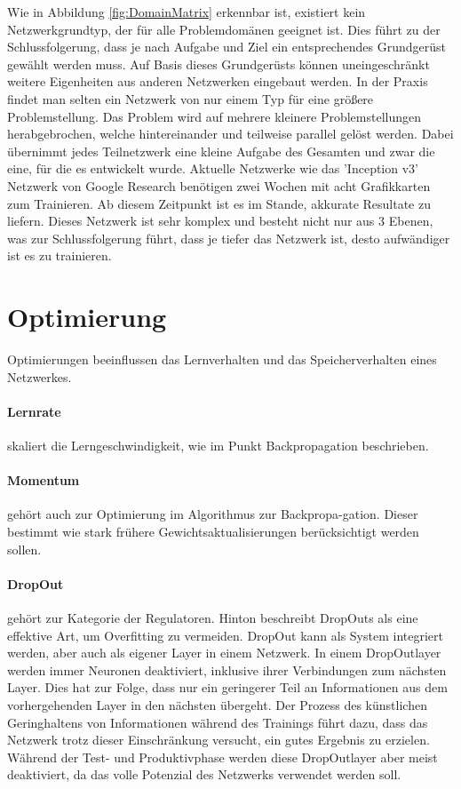Wie in Abbildung \ref{fig:DomainMatrix} erkennbar ist, existiert kein Netzwerkgrundtyp, der für alle Problemdomänen geeignet ist.
Dies führt zu der Schlussfolgerung, dass je nach Aufgabe und Ziel ein entsprechendes Grundgerüst gewählt werden muss. 
Auf Basis dieses Grundgerüsts können uneingeschränkt weitere Eigenheiten aus anderen Netzwerken eingebaut werden.
In der Praxis findet man selten ein Netzwerk von nur einem Typ für eine größere Problemstellung. 
Das Problem wird auf mehrere kleinere Problemstellungen herabgebrochen, welche hintereinander und teilweise parallel gelöst werden.
Dabei übernimmt jedes Teilnetzwerk eine kleine Aufgabe des Gesamten und zwar die eine, für die es entwickelt wurde. 
Aktuelle Netzwerke wie das 'Inception v3' Netzwerk von Google Research benötigen zwei Wochen mit acht Grafikkarten zum Trainieren. 
Ab diesem Zeitpunkt ist es im Stande, akkurate Resultate zu liefern. 
Dieses Netzwerk ist sehr komplex und besteht nicht nur aus 3 Ebenen, was zur Schlussfolgerung führt, dass je tiefer das Netzwerk ist, desto aufwändiger ist es zu trainieren.

\section{Optimierung}

Optimierungen beeinflussen das Lernverhalten und das Speicherverhalten eines Netzwerkes.

\paragraph{Lernrate} skaliert die Lerngeschwindigkeit, wie im Punkt Backpropagation beschrieben.

\paragraph{Momentum} gehört auch zur Optimierung im Algorithmus zur Backpropa-gation.
Dieser bestimmt wie stark frühere Gewichtsaktualisierungen berücksichtigt werden sollen. 

\paragraph{DropOut} gehört zur Kategorie der Regulatoren. 
Hinton \cite{krizhevsky2012imagenet} beschreibt DropOuts als eine effektive Art, um Overfitting zu vermeiden.
DropOut kann als System integriert werden, aber auch als eigener Layer in einem Netzwerk.
In einem DropOutlayer werden immer Neuronen deaktiviert, inklusive ihrer Verbindungen zum nächsten Layer.
Dies hat zur Folge, dass nur ein geringerer Teil an Informationen aus dem vorhergehenden Layer in den nächsten übergeht. 
Der Prozess des künstlichen Geringhaltens von Informationen während des Trainings führt dazu, dass das Netzwerk trotz dieser Einschränkung versucht, ein gutes Ergebnis zu erzielen. 
Während der Test- und Produktivphase werden diese DropOutlayer aber meist deaktiviert, da das volle Potenzial des Netzwerks verwendet werden soll.

